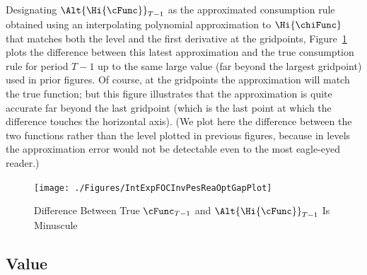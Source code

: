 \documentclass[titlepage, headings=optiontotocandhead]{\econtex}
\begin{document}
Designating $\Alt{\Hi{\cFunc}}_{T-1}$ as the approximated consumption rule obtained using an interpolating polynomial approximation to $\Hi{\chiFunc}$ that matches both the level and the first derivative at the gridpoints, Figure~\ref{fig:IntExpFOCInvPesReaOptGapPlot} plots the difference between this latest approximation and the true consumption rule for period $T-1$ up to the same large value (far beyond the largest gridpoint) used in prior figures.  Of course, at the gridpoints the approximation will match the true function; but this figure illustrates that the approximation is quite accurate far beyond the last gridpoint (which is the last point at which the difference touches the horizontal axis).  (We plot here the difference between the two functions rather than the level plotted in previous figures, because in levels the approximation error would not be detectable even to the most eagle-eyed reader.)



\hypertarget{IntExpFOCInvPesReaOptGapPlot}{}
\begin{figure}
  \texttt{[image: ./Figures/IntExpFOCInvPesReaOptGapPlot]}
  \caption{Difference Between True $\cFunc_{T-1}$ and $\Alt{\Hi{\cFunc}}_{T-1}$ Is Minuscule}
  \label{fig:IntExpFOCInvPesReaOptGapPlot}
\end{figure}




\hypertarget{Value}{}
\subsection{Value}
\end{document}
